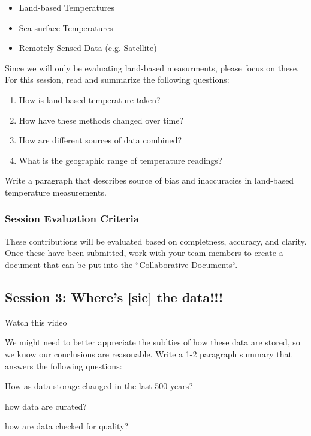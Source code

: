 \documentclass{article}\usepackage[]{graphicx}\usepackage[]{color}
\newenvironment{enumerate*}%
  {\begin{enumerate}%
    \setlength{\itemsep}{0pt}%
    \setlength{\parskip}{0pt}}%
  {\end{enumerate}}
\begin{document}
\begin{itemize}
  \item Land-based Temperatures
  \item Sea-surface Temperatures
  \item Remotely Sensed Data (e.g. Satellite) 
\end{itemize}

Since we will only be evaluating land-based measurments, please focus on these. For this session, read and summarize the following questions:

\begin{enumerate}
  \item How is land-based temperature taken?
  \item How have these methods changed over time?
  \item How are different sources of data combined?
  \item What is the geographic range of temperature readings?
\end{enumerate}

Write a paragraph that describes source of bias and inaccuracies in land-based temperature measurements. 

\subsubsection{Session Evaluation Criteria}

These contributions will be evaluated based on completness, accuracy, and clarity. Once these have been submitted, work with your team members to create a document that can be put into the ``Collaborative Documents``.

\subsection{Session 3: Where's [sic] the data!!!}

Watch this video

We might need to better appreciate the sublties of how these data are stored, so we know our conclusions are reasonable. Write a 1-2 paragraph summary that answers the following questions: 

\begin{enumerate*}
  \item How as data storage changed in the last 500 years?
  \item how data are curated? 
  \item how are data checked for quality?
\end{enumerate*}
\end{document}
